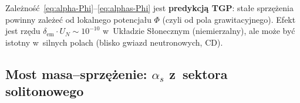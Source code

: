\begin{remark}[Testowalność]\label{rem:coupling-test}
Zależność~\eqref{eq:alpha-Phi}--\eqref{eq:alphas-Phi} jest
\textbf{predykcją TGP}: stałe sprzężenia powinny zależeć od
lokalnego potencjału $\Phi$ (czyli od pola grawitacyjnego).
Efekt jest rzędu $\delta_{\mathrm{em}} \cdot U_N \sim 10^{-10}$
w~Układzie Słonecznym (niemierzalny), ale może być istotny
w~silnych polach (blisko gwiazd neutronowych, CD).
\end{remark}

\subsection{Most masa--sprz\k{e}\.zenie: $\alpha_s$ z~sektora solitonowego}%
\label{ssec:alphas-soliton-bridge}

